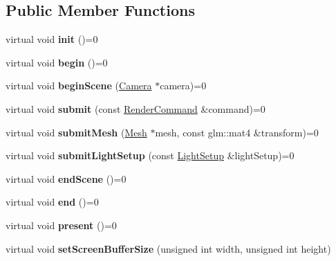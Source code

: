 \subsection*{Public Member Functions}
\begin{DoxyCompactItemize}
\item 
\mbox{\label{classce_1_1graphics_1_1_renderer3_d_ae887bbdc74af40838e6d059d30bb430b}} 
virtual void {\bfseries init} ()=0
\item 
\mbox{\label{classce_1_1graphics_1_1_renderer3_d_a51818b5b581c33001ddbbc6dff9d6e36}} 
virtual void {\bfseries begin} ()=0
\item 
\mbox{\label{classce_1_1graphics_1_1_renderer3_d_a94e60931e0ff3f26b217db09a11ee7e6}} 
virtual void {\bfseries begin\+Scene} (\hyperlink{classce_1_1graphics_1_1_camera}{Camera} $\ast$camera)=0
\item 
\mbox{\label{classce_1_1graphics_1_1_renderer3_d_a67e956930a17600cdcfc689aa624f990}} 
virtual void {\bfseries submit} (const \hyperlink{structce_1_1graphics_1_1_render_command}{Render\+Command} \&command)=0
\item 
\mbox{\label{classce_1_1graphics_1_1_renderer3_d_aba7b0abfa0aad0d89a816923e83ef787}} 
virtual void {\bfseries submit\+Mesh} (\hyperlink{classce_1_1graphics_1_1_mesh}{Mesh} $\ast$mesh, const glm\+::mat4 \&transform)=0
\item 
\mbox{\label{classce_1_1graphics_1_1_renderer3_d_a4a2eb6efe3adbff611c20141159eb3dc}} 
virtual void {\bfseries submit\+Light\+Setup} (const \hyperlink{structce_1_1graphics_1_1_light_setup}{Light\+Setup} \&light\+Setup)=0
\item 
\mbox{\label{classce_1_1graphics_1_1_renderer3_d_a0b8feaf1dd7f6ee03c7be2197d012e25}} 
virtual void {\bfseries end\+Scene} ()=0
\item 
\mbox{\label{classce_1_1graphics_1_1_renderer3_d_a4d35e07f42a4fb42ebe3f8e57bfcdb58}} 
virtual void {\bfseries end} ()=0
\item 
\mbox{\label{classce_1_1graphics_1_1_renderer3_d_a7b258350b5af957550a2d29800d3c5b7}} 
virtual void {\bfseries present} ()=0
\item 
\mbox{\label{classce_1_1graphics_1_1_renderer3_d_a39b5c5b8a62c71600d23de2d642e1546}} 
virtual void {\bfseries set\+Screen\+Buffer\+Size} (unsigned int width, unsigned int height)
\end{DoxyCompactItemize}
